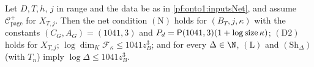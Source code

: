 \begin{theorem}\label{pf:onto1:netrun}
Let $D,T,h$, $j$ in range and the data be as in \cref{pf:onto1:inputsNet}, and assume $\mathcal C^+_{\mathrm{page}}$ for $X_{T,j}$.
Then the net condition $(\mathrm N)$ holds for $(B_T,j,\kappa)$ with the constants $(C_G,A_G)=(1041,3)$ and
$P_d=\mathsf{P}(1041,3)(1+\log\operatorname{size}\kappa)$; $(\mathrm D2)$ holds for $X_{T,j}$; $\log\dim_K\mathcal F_\kappa\le1041z_B^3$; and for
every $\Delta\in\N$, $(\mathrm L)$ and $(\mathrm{Sh}_\Delta)$ (with $T_n$) imply $\log\Delta\le1041z_B^3$.
\end{theorem}

